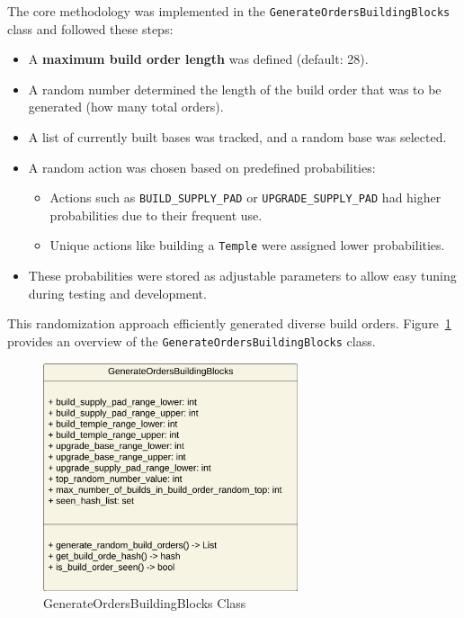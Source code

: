 \documentclass[a4paper, 12pt, english]{article}
\begin{document}
The core methodology was implemented in the \texttt{GenerateOrdersBuildingBlocks} class and followed these steps:
\begin{itemize}
    \item A \textbf{maximum build order length} was defined (default: 28).
    \item A random number determined the length of the build order that was to be generated (how many total orders).
    \item A list of currently built bases was tracked, and a random base was selected.
    \item A random action was chosen based on predefined probabilities:
        \begin{itemize}
            \item Actions such as \texttt{BUILD\_SUPPLY\_PAD} or \texttt{UPGRADE\_SUPPLY\_PAD} had higher probabilities due to their frequent use.
            \item Unique actions like building a \texttt{Temple} were assigned lower probabilities.
        \end{itemize}
    \item These probabilities were stored as adjustable parameters to allow easy tuning during testing and development.
\end{itemize}

This randomization approach efficiently generated diverse build orders. Figure~\ref{fig:OrderGeneratorClass} provides an overview of the \texttt{GenerateOrdersBuildingBlocks} class.

\begin{figure}[!ht]
    \begin{center}
        \includegraphics[width=75mm,scale=1.0]{HaloWarsDiagramGenerateOrdersBuildingBlocks.png}
    \end{center}
    \caption{\label{fig:OrderGeneratorClass}GenerateOrdersBuildingBlocks Class}
\end{figure}
\end{document}
